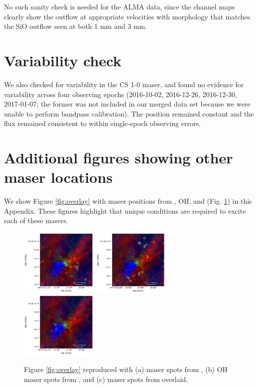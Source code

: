 \documentclass[twocolumn]{aastex62}
\begin{document}
No such sanity check is needed for the ALMA data, since the channel maps
clearly show the outflow at appropriate velocities with morphology that matches
the SiO outflow seen at both 1 mm and 3 mm.

\section{Variability check}
We also checked for variability in the CS 1-0 maser, and found no evidence for
variability across four observing epochs (2016-10-02, 2016-12-26, 2016-12-30,
2017-01-07; the former was not included in our merged data set because we were unable
to perform bandpass calibration).  The position remained constant and the flux
remained consistent to within single-epoch observing errors.

\section{Additional figures showing other maser locations}
\label{sec:extrafigs}
We show Figure \ref{fig:overlay} with maser positions from \methanol, OH, and
\water (Fig.  \ref{fig:maseroverlay}) in this Appendix.  These figures
highlight that unique conditions are required to excite each of these masers.

\begin{figure}[htp]
    \includegraphics[width=0.33\textwidth]{figures/W51e2e_sio_outflow_with_CS_contours_and_ch3oh.pdf}
    \includegraphics[width=0.33\textwidth]{figures/W51e2e_sio_outflow_with_CS_contours_and_OH.pdf}
    \includegraphics[width=0.33\textwidth]{figures/W51e2e_sio_outflow_with_CS_contours_and_H2O.pdf}
    \caption{Figure \ref{fig:overlay} reproduced with (a) \methanol maser spots
    from \citet{Etoka2012a}, (b) OH maser spots from \citet{Fish2007a}, and (c)
    \water maser spots from \citet{Sato2010a} overlaid.
    }
    \label{fig:maseroverlay}
\end{figure}



\end{document}
